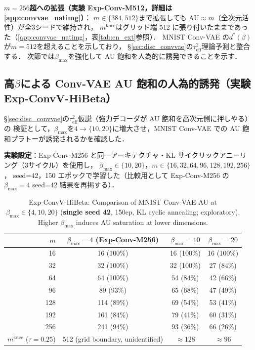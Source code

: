 \documentclass[11pt,a4paper]{jsarticle}
\newcommand{\mknee}{m^{\mathrm{knee}}}
\begin{document}
\textbf{$m=256$超への拡張（実験 Exp-Conv-M512，詳細は\ref{app:convvae_natimg}）}：
$m \in \{384, 512\}$まで拡張しても AU$\approx m$（全次元活性）が全3シードで維持され，
$\mknee$はグリッド端 512 に張り付いたままであった（\ref{app:convvae_natimg}，表\ref{tab:en_ext}参照）．
MNIST Conv-VAE の$d^*(\beta)$が$m=512$を超えることを示しており，
§\ref{sec:disc_convvae}の$\tau^2_\mathrm{eff}$理論予測と整合する．
次節では$\beta_{\max}$を強化して AU 飽和を人為的に誘発できることを示す．

\subsection{高$\beta$による Conv-VAE AU 飽和の人為的誘発（実験 Exp-ConvV-HiBeta）}\label{sec:exp_hibeta}

§\ref{sec:disc_convvae}の$\tau^2_\mathrm{eff}$仮説（強力デコーダが AU 飽和を高次元側に押しやる）の
検証として，$\beta_{\max}$を$4 \to \{10, 20\}$に増大させ，MNIST Conv-VAE での
AU 飽和プラトーが誘発されるかを確認した．

\textbf{実験設定}：Exp-Conv-M256 と同一アーキテクチャ・KL サイクリックアニーリング（3サイクル）を使用し，
$\beta_{\max} \in \{10, 20\}$，$m \in \{16, 32, 64, 96, 128, 192, 256\}$，
seed=42，150 エポックで学習した（比較用として Exp-Conv-M256 の$\beta_{\max}=4$ seed=42 結果を再掲する）．

\begin{table}[H]
\centering
\caption{Exp-ConvV-HiBeta: Comparison of MNIST Conv-VAE AU at $\beta_\mathrm{max} \in \{4, 10, 20\}$ (\textbf{single seed 42}, 150ep, KL cyclic annealing; exploratory). Higher $\beta_\mathrm{max}$ induces AU saturation at lower dimensions.}
\label{tab:hibeta}
\small
\begin{tabular}{r ccc}
\toprule
$m$ & $\beta_{\max}=4$ (Exp-Conv-M256) & $\beta_{\max}=10$ & $\beta_{\max}=20$ \\
\midrule
 16  & 16  (100\%)& 16 (100\%) & 16 (100\%) \\
 32  & 32  (100\%)& 32 (100\%) & 27 (84\%)  \\
 64  & 64  (100\%)& 54 (84\%)  & 42 (66\%)  \\
 96  & 89  (93\%) & 65 (68\%)  & 47 (49\%)  \\
128  & 114 (89\%) & 69 (54\%)  & 53 (41\%)  \\
192  & 161 (84\%) & 79 (41\%)  & 60 (31\%)  \\
256  & 241 (94\%) & 93 (36\%)  & 66 (26\%)  \\
\midrule
$\mknee$ ($\tau=0.25$) & 512 (grid boundary, unidentified) & $\approx 128$ & $\approx 96$ \\
\bottomrule
\end{tabular}
\end{table}
\end{document}
